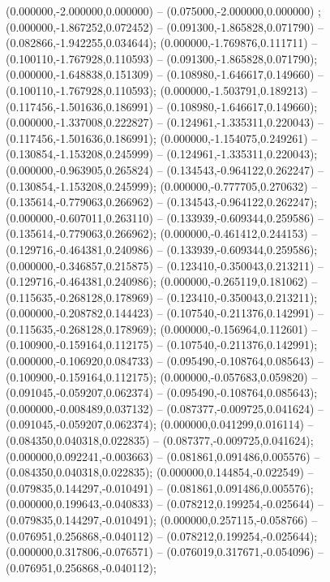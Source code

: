  (0.000000,-2.000000,0.000000) -- (0.075000,-2.000000,0.000000) ;
 (0.000000,-1.867252,0.072452) -- (0.091300,-1.865828,0.071790) -- (0.082866,-1.942255,0.034644);
 (0.000000,-1.769876,0.111711) -- (0.100110,-1.767928,0.110593) -- (0.091300,-1.865828,0.071790);
 (0.000000,-1.648838,0.151309) -- (0.108980,-1.646617,0.149660) -- (0.100110,-1.767928,0.110593);
 (0.000000,-1.503791,0.189213) -- (0.117456,-1.501636,0.186991) -- (0.108980,-1.646617,0.149660);
 (0.000000,-1.337008,0.222827) -- (0.124961,-1.335311,0.220043) -- (0.117456,-1.501636,0.186991);
 (0.000000,-1.154075,0.249261) -- (0.130854,-1.153208,0.245999) -- (0.124961,-1.335311,0.220043);
 (0.000000,-0.963905,0.265824) -- (0.134543,-0.964122,0.262247) -- (0.130854,-1.153208,0.245999);
 (0.000000,-0.777705,0.270632) -- (0.135614,-0.779063,0.266962) -- (0.134543,-0.964122,0.262247);
 (0.000000,-0.607011,0.263110) -- (0.133939,-0.609344,0.259586) -- (0.135614,-0.779063,0.266962);
 (0.000000,-0.461412,0.244153) -- (0.129716,-0.464381,0.240986) -- (0.133939,-0.609344,0.259586);
 (0.000000,-0.346857,0.215875) -- (0.123410,-0.350043,0.213211) -- (0.129716,-0.464381,0.240986);
 (0.000000,-0.265119,0.181062) -- (0.115635,-0.268128,0.178969) -- (0.123410,-0.350043,0.213211);
 (0.000000,-0.208782,0.144423) -- (0.107540,-0.211376,0.142991) -- (0.115635,-0.268128,0.178969);
 (0.000000,-0.156964,0.112601) -- (0.100900,-0.159164,0.112175) -- (0.107540,-0.211376,0.142991);
 (0.000000,-0.106920,0.084733) -- (0.095490,-0.108764,0.085643) -- (0.100900,-0.159164,0.112175);
 (0.000000,-0.057683,0.059820) -- (0.091045,-0.059207,0.062374) -- (0.095490,-0.108764,0.085643);
 (0.000000,-0.008489,0.037132) -- (0.087377,-0.009725,0.041624) -- (0.091045,-0.059207,0.062374);
 (0.000000,0.041299,0.016114) -- (0.084350,0.040318,0.022835) -- (0.087377,-0.009725,0.041624);
 (0.000000,0.092241,-0.003663) -- (0.081861,0.091486,0.005576) -- (0.084350,0.040318,0.022835);
 (0.000000,0.144854,-0.022549) -- (0.079835,0.144297,-0.010491) -- (0.081861,0.091486,0.005576);
 (0.000000,0.199643,-0.040833) -- (0.078212,0.199254,-0.025644) -- (0.079835,0.144297,-0.010491);
 (0.000000,0.257115,-0.058766) -- (0.076951,0.256868,-0.040112) -- (0.078212,0.199254,-0.025644);
 (0.000000,0.317806,-0.076571) -- (0.076019,0.317671,-0.054096) -- (0.076951,0.256868,-0.040112);
